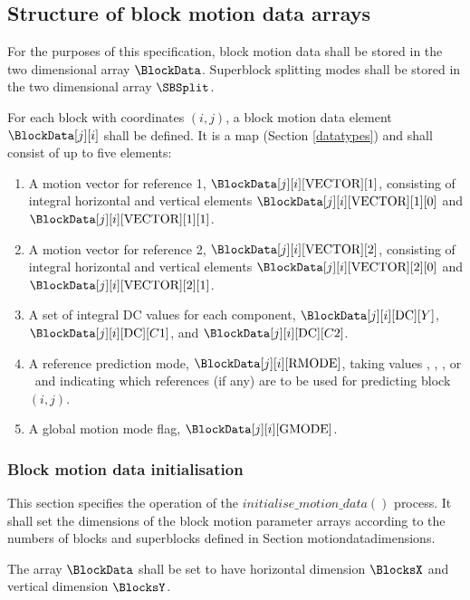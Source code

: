 \subsection{Structure of block motion data arrays}

\label{motionconventions}

For the purposes of this specification, block motion data shall be stored in the 
two dimensional array $\BlockData$. Superblock
splitting modes shall be stored in the two dimensional array $\SBSplit$.

For each block with coordinates $(i,j)$, a block motion data element 
$\BlockData[j][i]$ shall be defined. It is a map (Section \ref{datatypes}) and shall
consist of up to five elements:

\begin{enumerate}
\item A motion vector for reference 1, $\BlockData[j][i][\Vect][1]$, consisting of 
integral horizontal and vertical elements $\BlockData[j][i][\Vect][1][0]$ and 
$\BlockData[j][i][\Vect][1][1]$.
\item A motion vector for reference 2, $\BlockData[j][i][\Vect][2]$, consisting of 
integral horizontal and vertical elements $\BlockData[j][i][\Vect][2][0]$ and 
$\BlockData[j][i][\Vect][2][1]$.
\item A set of integral DC values for each component, $\BlockData[j][i][\DC][Y]$,
 $\BlockData[j][i][\DC][C1]$, and $\BlockData[j][i][\DC][C2]$.
\item A reference prediction mode, $\BlockData[j][i][\RMode]$, taking values \Intra, 
\RefOneOnly, \RefTwoOnly, or \RefOneAndTwo~and indicating which references
(if any) are to be used for predicting block $(i,j)$.
\item A global motion mode flag, $\BlockData[j][i][\GMode]$.
\end{enumerate}

\subsubsection{Block motion data initialisation}

\label{motioninit}

This section specifies the operation of the $initialise\_motion\_data()$ process.
 It shall set the dimensions of the block motion parameter arrays according to the numbers
of blocks and superblocks defined in Section {motiondatadimensions}.

The array $\BlockData$ shall be set to have horizontal dimension $\BlocksX$ and 
vertical dimension $\BlocksY$.

